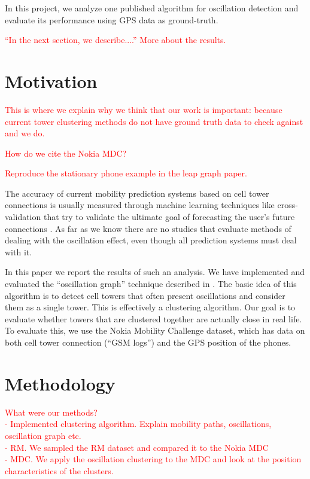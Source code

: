 \documentclass[a4paper,10pt]{article}
\newcommand{\xxx}[1]{\textcolor{red}{#1}}
\begin{document}
In this project, we analyze one published algorithm for oscillation detection \cite{mobilityprofiler} and evaluate its performance using GPS data as ground-truth.

\xxx{``In the next section, we describe....''}
\xxx{More about the results.}

\section{Motivation}

\xxx{This is where we explain why we think that our work is important: because current tower clustering methods do not have ground truth data to check against and we do.}

\xxx{How do we cite the Nokia MDC?}

\xxx{Reproduce the stationary phone example in the leap graph paper.}

The accuracy of current mobility prediction systems based on cell tower connections is usually measured through machine learning techniques like cross-validation that try to validate the ultimate goal of forecasting the user's future connections \cite{LeapGraph}. As far as we know there are no studies that evaluate methods of dealing with the oscillation effect, even though all prediction systems must deal with it.

In this paper we report the results of such an analysis. We have implemented and evaluated the ``oscillation graph'' technique described in \cite{mobilityprofiler}. The basic idea of this algorithm is to detect cell towers that often present oscillations and consider them as a single tower. This is effectively a clustering algorithm. Our goal is to evaluate whether towers that are clustered together are actually close in real life. To evaluate this, we use the Nokia Mobility Challenge dataset, which has data on both cell tower connection (``GSM logs'') and the GPS position of the phones.

\section{Methodology}

\xxx{What were our methods?\\- Implemented clustering algorithm. Explain mobility paths, oscillations, oscillation graph etc. \\- RM. We sampled the RM dataset and compared it to
the Nokia MDC \\- MDC. We apply the oscillation clustering to the MDC and look at the position
characteristics of the clusters.}
\end{document}
